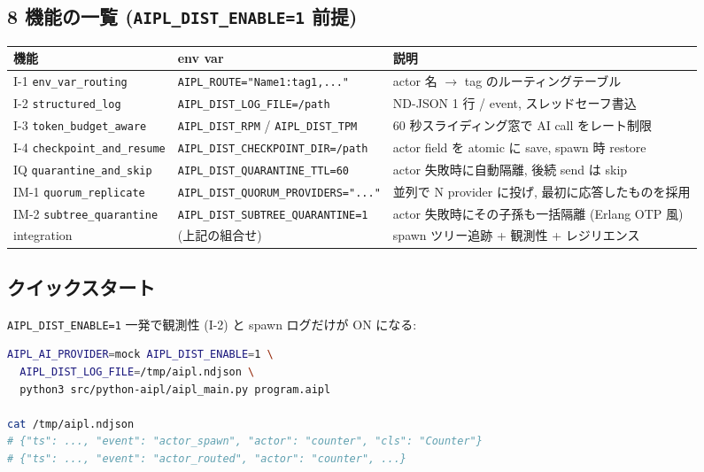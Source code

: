 \documentclass[11pt,a4paper]{article}
\begin{document}
\subsection{8 機能の一覧 (\texttt{AIPL\_DIST\_ENABLE=1} 前提)}

\begin{center}
\begin{tabular}{p{2.5cm}p{5.5cm}p{6cm}}
\toprule
機能 & env var & 説明 \\
\midrule
I-1 \texttt{env\_var\_routing} & \texttt{AIPL\_ROUTE="Name1:tag1,..."} & actor 名 $\to$ tag のルーティングテーブル \\
I-2 \texttt{structured\_log} & \texttt{AIPL\_DIST\_LOG\_FILE=/path} & ND-JSON 1 行 / event, スレッドセーフ書込 \\
I-3 \texttt{token\_budget\_aware} & \texttt{AIPL\_DIST\_RPM} / \texttt{AIPL\_DIST\_TPM} & 60 秒スライディング窓で AI call をレート制限 \\
I-4 \texttt{checkpoint\_and\_resume} & \texttt{AIPL\_DIST\_CHECKPOINT\_DIR=/path} & actor field を atomic に save, spawn 時 restore \\
IQ \texttt{quarantine\_and\_skip} & \texttt{AIPL\_DIST\_QUARANTINE\_TTL=60} & actor 失敗時に自動隔離, 後続 send は skip \\
IM-1 \texttt{quorum\_replicate} & \texttt{AIPL\_DIST\_QUORUM\_PROVIDERS="..."} & 並列で N provider に投げ, 最初に応答したものを採用 \\
IM-2 \texttt{subtree\_quarantine} & \texttt{AIPL\_DIST\_SUBTREE\_QUARANTINE=1} & actor 失敗時にその子孫も一括隔離 (Erlang OTP 風) \\
integration & (上記の組合せ) & spawn ツリー追跡 + 観測性 + レジリエンス \\
\bottomrule
\end{tabular}
\end{center}

\subsection{クイックスタート}

\texttt{AIPL\_DIST\_ENABLE=1} 一発で観測性 (I-2) と spawn ログだけが ON になる:

\begin{lstlisting}[language=bash]
AIPL_AI_PROVIDER=mock AIPL_DIST_ENABLE=1 \
  AIPL_DIST_LOG_FILE=/tmp/aipl.ndjson \
  python3 src/python-aipl/aipl_main.py program.aipl

cat /tmp/aipl.ndjson
# {"ts": ..., "event": "actor_spawn", "actor": "counter", "cls": "Counter"}
# {"ts": ..., "event": "actor_routed", "actor": "counter", ...}
\end{lstlisting}
\end{document}
